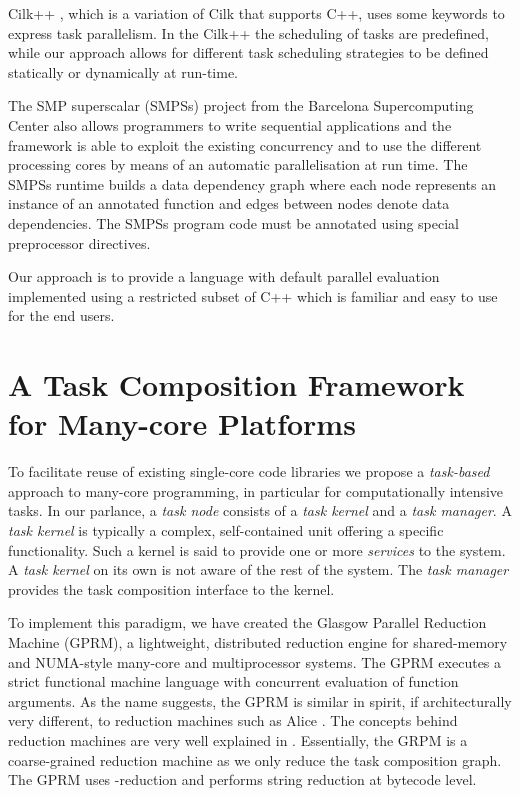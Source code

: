 \documentclass[copyright,creativecommons]{eptcs}
\begin{document}
Cilk++ \cite{leiserson2010cilk++}, which is a variation of Cilk that
supports C++, uses some keywords to express task parallelism. In the
Cilk++ the scheduling of tasks are predefined, while our approach
allows for different task scheduling strategies to be defined statically
or dynamically at run-time.

The SMP superscalar (SMPSs) project from the Barcelona Supercomputing
Center \cite{superscalar2008user,perez2008dependency} also allows
programmers to write sequential applications and the framework is
able to exploit the existing concurrency and to use the different
processing cores by means of an automatic parallelisation at run time.
The SMPSs runtime builds a data dependency graph where each node represents
an instance of an annotated function and edges between nodes denote
data dependencies. The SMPSs program code must be annotated using
special preprocessor directives. 

Our approach is to provide a language with default parallel evaluation
implemented using a restricted subset of C++ which is familiar and
easy to use for the end users. 


\section{A Task Composition Framework for Many-core Platforms}

To facilitate reuse of existing single-core code libraries we propose
a \emph{task-based} approach to many-core programming, in particular
for computationally intensive tasks. In our parlance, a \emph{task
node} consists of a \emph{task kernel} and a \emph{task manager}.
A \emph{task kernel} is typically a complex, self-contained unit offering
a specific functionality. Such a kernel is said to provide one or
more \emph{services} to the system. A \emph{task kernel} on its own
is not aware of the rest of the system. The \emph{task manager} provides
the task composition interface to the kernel. 

To implement this paradigm, we have created the Glasgow Parallel Reduction
Machine (GPRM), a lightweight, distributed reduction engine for shared-memory
and NUMA-style many-core and multiprocessor systems. The GPRM executes
a strict functional machine language with concurrent evaluation of
function arguments. As the name suggests, the GPRM is similar in spirit,
if architecturally very different, to reduction machines such as Alice
\cite{harrison1987parallel}. The concepts behind reduction machines
are very well explained in \cite{vree1989design}. Essentially, the
GRPM is a coarse-grained reduction machine as we only reduce the task
composition graph. The GPRM uses -reduction and performs string
reduction at bytecode level.
\end{document}
